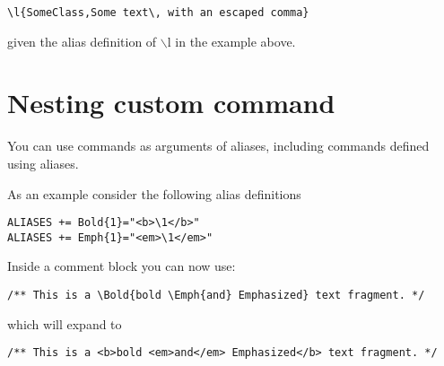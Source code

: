 \footnotesize\begin{verbatim}
\l{SomeClass,Some text\, with an escaped comma} 
\end{verbatim}
\normalsize
 given the alias definition of $\backslash$l in the example above.\hypertarget{custcmd_custcmd_nesting}{}\section{Nesting custom command}\label{custcmd_custcmd_nesting}
You can use commands as arguments of aliases, including commands defined using aliases.

As an example consider the following alias definitions



\footnotesize\begin{verbatim}
ALIASES += Bold{1}="<b>\1</b>"
ALIASES += Emph{1}="<em>\1</em>"
\end{verbatim}
\normalsize


Inside a comment block you can now use: 

\footnotesize\begin{verbatim}
/** This is a \Bold{bold \Emph{and} Emphasized} text fragment. */
\end{verbatim}
\normalsize
 which will expand to 

\footnotesize\begin{verbatim}
/** This is a <b>bold <em>and</em> Emphasized</b> text fragment. */
\end{verbatim}
\normalsize
 